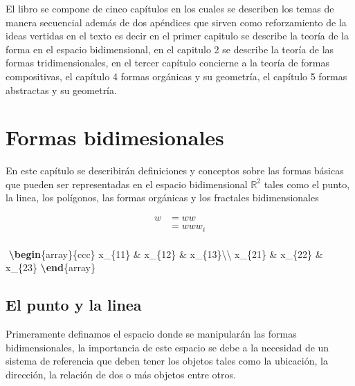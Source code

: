 \documentclass[
  16pt,
]{krantz}
\newenvironment{Shaded}{\begin{snugshade}}{\end{snugshade}}
\newcommand{\ExtensionTok}[1]{#1}
\newcommand{\KeywordTok}[1]{\textcolor[rgb]{0.13,0.29,0.53}{\textbf{#1}}}
\newcommand{\NormalTok}[1]{#1}
\newcommand{\SpecialCharTok}[1]{\textcolor[rgb]{0.00,0.00,0.00}{#1}}
\newcommand{\SpecialStringTok}[1]{\textcolor[rgb]{0.31,0.60,0.02}{#1}}
\theoremstyle{definition}
\theoremstyle{definition}
\theoremstyle{definition}
\theoremstyle{definition}
\theoremstyle{remark}
\begin{document}
El libro se compone de cinco capítulos en los cuales se describen los temas de manera secuencial además de dos apéndices que sirven como reforzamiento de la ideas vertidas en el texto es decir en el primer capitulo se describe la teoría de la forma en el espacio bidimensional, en el capitulo 2 se describe la teoría de las formas tridimensionales, en el tercer capítulo concierne a la teoría de formas compositivas, el capítulo 4 formas orgánicas y su geometría, el capítulo 5 formas abstractas y su geometría.

\mainmatter

\hypertarget{formas-bidimesionales}{%
\chapter{Formas bidimesionales}\label{formas-bidimesionales}}

En este capítulo se describirán definiciones y conceptos sobre las formas básicas que pueden ser representadas en el espacio bidimensional \(\mathbb{R}^2\) tales como el punto, la linea, los polígonos, las formas orgánicas y los fractales bidimensionales

\begin{align}
w&=ww\\
&=www_i\\
\end{align}

\begin{Shaded}
\begin{Highlighting}[]
\SpecialStringTok{$$}
\KeywordTok{\textbackslash{}begin}\NormalTok{\{}\ExtensionTok{array}\NormalTok{\}}\SpecialStringTok{\{ccc\}}
\SpecialStringTok{x\_\{11\} \& x\_\{12\} \& x\_\{13\}}\SpecialCharTok{\textbackslash{}\textbackslash{}}
\SpecialStringTok{x\_\{21\} \& x\_\{22\} \& x\_\{23\}}
\KeywordTok{\textbackslash{}end}\NormalTok{\{}\ExtensionTok{array}\NormalTok{\}}
\SpecialStringTok{$$}
\end{Highlighting}
\end{Shaded}

\hypertarget{el-punto-y-la-linea}{%
\section{El punto y la linea}\label{el-punto-y-la-linea}}

Primeramente definamos el espacio donde se manipularán las formas bidimensionales, la importancia de este espacio se debe a la necesidad de un sistema de referencia que deben tener los objetos tales como la ubicación, la dirección, la relación de dos o más objetos entre otros.
\end{document}
